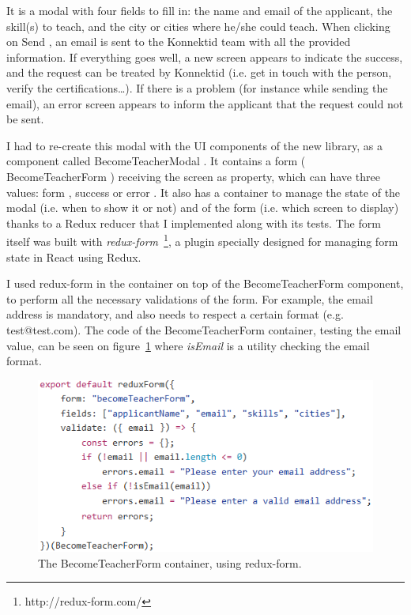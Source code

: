 It is a modal with four fields to fill in: the name and email of the applicant, the skill(s) to teach, and the city or cities where he/she could teach. When clicking on \guillemotleft{} Send \guillemotright{}, an email is sent to the Konnektid team with all the provided information. If everything goes well, a new screen appears to indicate the success, and the request can be treated by Konnektid (i.e. get in touch with the person, verify the certifications\ldots). If there is a problem (for instance while sending the email), an error screen appears to inform the applicant that the request could not be sent.

I had to re-create this modal with the UI components of the new library, as a component called \guillemotleft{} BecomeTeacherModal \guillemotright{}. It contains a form (\guillemotleft{} BecomeTeacherForm \guillemotright{}) receiving the screen as property, which can have three values: \guillemotleft{} form \guillemotright{}, \guillemotleft{} success \guillemotright{} or \guillemotleft{} error \guillemotright{}. It also has a container to manage the state of the modal (i.e. when to show it or not) and of the form (i.e. which screen to display) thanks to a Redux reducer that I implemented along with its tests. The form itself was built with \textit{redux-form}~\footnote{http://redux-form.com/}, a plugin specially designed for managing form state in React using Redux.

I used redux-form in the container on top of the BecomeTeacherForm component, to perform all the necessary validations of the form. For example, the email address is mandatory, and also needs to respect a certain format (e.g. test@test.com). The code of the BecomeTeacherForm container, testing the email value, can be seen on {\sc figure}~\ref{fig:reduxForm} where \textit{isEmail} is a utility checking the email format.

 \begin{figure}[H]
    \centering
    \includegraphics[scale=0.8]{figure/reduxForm.png}
    \caption{The BecomeTeacherForm container, using redux-form.}
    \label{fig:reduxForm}
\end{figure}

